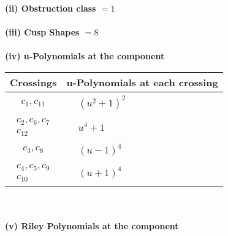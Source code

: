 \documentclass[1p]{elsarticle_modified}
\theoremstyle{definition}
\begin{document}
\flushleft \textbf{(ii) Obstruction class $= 1$}\\~\\
\flushleft \textbf{(iii) Cusp Shapes $= 8$}\\~\\
\newpage\renewcommand{\arraystretch}{1}
\flushleft \textbf{(iv) u-Polynomials at the component}\newline \\
\begin{tabular}{m{50pt}|m{274pt}}
Crossings & \hspace{64pt}u-Polynomials at each crossing \\
\hline $$\begin{aligned}c_{1},c_{11}\end{aligned}$$&$\begin{aligned}
&(u^2+1)^2
\end{aligned}$\\
\hline $$\begin{aligned}c_{2},c_{6},c_{7}\\c_{12}\end{aligned}$$&$\begin{aligned}
&u^4+1
\end{aligned}$\\
\hline $$\begin{aligned}c_{3},c_{8}\end{aligned}$$&$\begin{aligned}
&(u-1)^4
\end{aligned}$\\
\hline $$\begin{aligned}c_{4},c_{5},c_{9}\\c_{10}\end{aligned}$$&$\begin{aligned}
&(u+1)^4
\end{aligned}$\\
\hline
\end{tabular}\\~\\
\newpage\renewcommand{\arraystretch}{1}
\flushleft \textbf{(v) Riley Polynomials at the component}\newline \\
\end{document}
